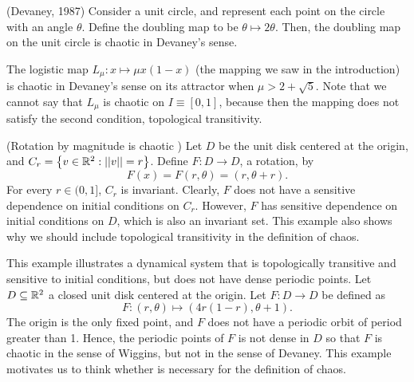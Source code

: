 \documentclass[12pt,draft,twoside]{book}
\begin{document}
  \begin{example}
    (Devaney, 1987)
    Consider a unit circle, and represent each point on the circle with an angle $\theta$.
    Define the doubling map to be $\theta \mapsto 2\theta$.
    Then, the doubling map on the unit circle is chaotic in Devaney's sense.
  \end{example}
  \begin{example}
    The logistic map $L_\mu: x \mapsto \mu x(1-x)$ (the mapping we saw in the introduction) is chaotic in Devaney's sense on its attractor when $\mu > 2 + \sqrt{5}$.
    Note that we cannot say that $L_\mu$ is chaotic on $I \equiv [0,1]$, because then the mapping does not satisfy the second condition, topological transitivity.
  \end{example}
  \begin{example}
    (Rotation by magnitude is chaotic \citep{martelli})
    Let $D$ be the unit disk centered at the origin, and $C_r = \left \{ v \in \mathbb{R}^2: \left|\left| v \right|\right| = r \right \}$.
    Define $F: D \to D$, a rotation, by
    \begin{equation*}
      F(x) = F(r, \theta) = (r, \theta + r).
    \end{equation*}
    For every $r \in (0,1]$, $C_r$ is invariant.
    Clearly, $F$ does not have a sensitive dependence on initial conditions on $C_r$.
    However, $F$ has sensitive dependence on initial conditions on $D$, which is also an invariant set. 
    This example also shows why we should include topological transitivity in the definition of chaos.
  \end{example}
  \begin{example}
    \citep{martelli}
    This example illustrates a dynamical system that is topologically transitive and sensitive to initial conditions, but does not have dense periodic points.
    Let $D \subseteq \mathbb{R}^2$ a closed unit disk centered at the origin.
    Let $F: D \to D$ be defined as
    \begin{equation*}
      F: (r, \theta) \mapsto (4r(1 - r), \theta + 1).
    \end{equation*}
    The origin is the only fixed point, and $F$ does not have a periodic orbit of period greater than 1.
    Hence, the periodic points of $F$ is not dense in $D$ so that $F$ is chaotic in the sense of Wiggins, but not in the sense of Devaney.
    This example motivates us to think whether \dpp is necessary for the definition of chaos.
    \label{eg:notdpp}
  \end{example}
\end{document}
